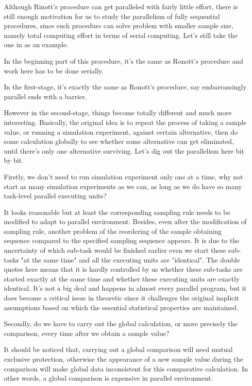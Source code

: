 \documentclass[12pt,a4]{report}
\begin{document}
Although Rinott's procedure can get paralleled with fairly little effort, there is still enough motivation for us to study the parallelism of fully sequential procedures, since such procedure can solve problem with smaller sample size, namely total computing effort in terms of serial computing. Let's still take the one in \cite{ras-seq-jeff} as an example.

In the beginning part of this procedure, it's the same as Ronott's procedure and work here has to be done serially.

In the first-stage, it's exactly the same as Ronott's procedure, say embarrassingly parallel ends with a barrier.

However in the second-stage, things become totally different and much more interesting. Basically, the original idea is to repeat the process of taking a sample value, or running a simulation experiment, against certain alternative, then do some calculation globally to see whether some alternative can get eliminated, until there's only one alternative surviving. Let's dig out the parallelism here bit by bit.

Firstly, we don't need to run simulation experiment only one at a time, why not start as many simulation experiments as we can, as long as we do have so many task-level parallel executing units?

It looks reasonable but at least the corresponding sampling rule needs to be modified to adapt to parallel environment. Besides, even after the modification of sampling rule, another problem of the reordering of the sample obtaining sequence compared to the specified sampling sequence appears. It is due to the uncertainty of which sub-task would be finished earlier even we start these sub-tasks "at the same time" and all the executing units are "identical". The double quotes here means that it is hardly controlled by us whether these sub-tasks are started exactly at the same time and whether these executing units are exactly identical. It's not a big deal and happens in almost every parallel program, but it does become a critical issue in theoretic since it challenges the original implicit assumptions based on which the essential statistical properties are maintained.

Secondly, do we have to carry out the global calculation, or more precisely the comparison, every time after we obtain a sample value?

It should be noticed that, carrying out a global comparison will need mutual exclusive protection, otherwise the appearance of a new sample value during the comparison will make global data inconsistent for this comparative calculation. In other words, a global comparison is expensive in parallel environment.
\end{document}
